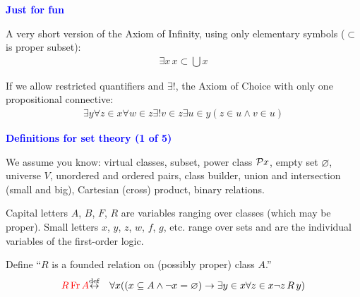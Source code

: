 \documentclass{slides}
\begin{document}
\begin{slide}

\begin{center}
\textcolor{blue}{\textbf{Just for fun}}
\end{center}

A very short version of the Axiom of Infinity, using only elementary
symbols ($\subset$ is proper subset):
\begin{eqnarray}
\exists x \,x \subset \bigcup x \label{inf5}
\end{eqnarray}

If we allow restricted quantifiers and $\exists !$, the Axiom of
Choice with only
one propositional connective:
\begin{eqnarray}
\exists y \forall z \in x \forall w \in z \exists{!} v \in z \exists u
\in y ( z \in u \wedge v \in u ) \label{ac2}
\end{eqnarray}


\end{slide}

\begin{slide}

\begin{center}
\textcolor{blue}{\textbf{Definitions for set theory (1 of 5)}}
\end{center}

We assume you know:  virtual classes,
subset, power class ${\cal P} x$, empty set
$\varnothing$, universe $V$, unordered and ordered pairs, class builder,
union and intersection (small and big), Cartesian (cross) product,
binary relations.

Capital letters $A$, $B$, $F$, $R$ are variables ranging
over classes (which may be proper).
Small letters $x$, $y$, $z$, $w$, $f$, $g$, etc. range over sets and are the
individual variables of the first-order logic.

Define ``$R$ is a founded relation on (possibly proper) class $A$.''
\begin{eqnarray}
\textcolor{red}{R \,{\rm Fr}\, A} & {\buildrel\rm def\over \leftrightarrow} & \forall x ( ( x \subseteq A \wedge \lnot
x = \varnothing ) \rightarrow \exists y \in x \forall z \in x \lnot z \,R \,y
)   \label{df-fr}
\end{eqnarray}

\end{slide}
\end{document}
